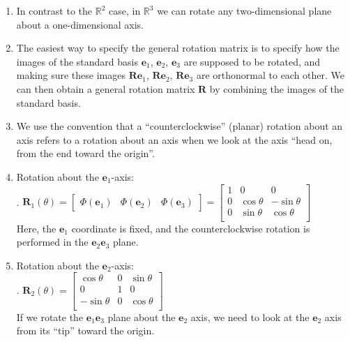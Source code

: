 \begin{enumerate}
    \item In contrast to the $\mathbb{R}^2$ case, in $\mathbb{R}^3$ we can rotate any two-dimensional plane about a one-dimensional axis.
    \hfill \cite{mfml/book/mml/Deisenroth-Faisal-Ong}

    \item The easiest way to specify the general rotation matrix is to specify how the images of the standard basis $\bm{e}_1$, $\bm{e}_2$, $\bm{e}_3$ are supposed to be rotated, and making sure these images $\bm{Re}_1$, $\bm{Re}_2$, $\bm{Re}_3$ are orthonormal to each other. 
    We can then obtain a general rotation matrix $\bm{R}$ by combining the images of the standard basis.
    \hfill \cite{mfml/book/mml/Deisenroth-Faisal-Ong}

    \item We use the convention that a “counterclockwise” (planar) rotation about an axis refers to a rotation about an axis when we look at the axis “head on, from the end toward the origin”.
    \hfill \cite{mfml/book/mml/Deisenroth-Faisal-Ong}



    \item Rotation about the $\bm{e}_1$-axis:
    \hfill \cite{mfml/book/mml/Deisenroth-Faisal-Ong}
    \\
    .\hfill
    $
        \bm{R}_1(\theta) 
        = \begin{bmatrix}\Phi(\bm{e}_1) & \Phi(\bm{e}_2) & \Phi(\bm{e}_3)\end{bmatrix}
        = \begin{bmatrix}
        1 & 0 & 0 \\
        0 & \cos \theta & - \sin \theta \\
        0 & \sin \theta & \cos \theta \\
        \end{bmatrix}
    $
    \hfill \cite{mfml/book/mml/Deisenroth-Faisal-Ong}
    \\
    Here, the $\bm{e}_1$ coordinate is fixed, and the counterclockwise rotation is performed in the $\bm{e}_2\bm{e}_3$ plane.
    \hfill \cite{mfml/book/mml/Deisenroth-Faisal-Ong}



    \item Rotation about the $\bm{e}_2$-axis:
    \hfill \cite{mfml/book/mml/Deisenroth-Faisal-Ong}
    \\
    .\hfill
    $
        \bm{R}_2(\theta) 
        = \begin{bmatrix}
        \cos \theta & 0 &  \sin \theta \\
        0 & 1 & 0 \\
        - \sin \theta & 0 & \cos \theta \\
        \end{bmatrix}
    $
    \hfill \cite{mfml/book/mml/Deisenroth-Faisal-Ong}
    \\
    If we rotate the $\bm{e}_1\bm{e}_3$ plane about the $\bm{e}_2$ axis, we need to look at the $\bm{e}_2$ axis from its “tip” toward the origin.
    \hfill \cite{mfml/book/mml/Deisenroth-Faisal-Ong}




\end{enumerate}
